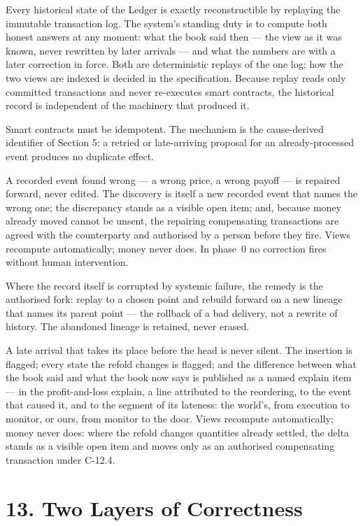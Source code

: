 \documentclass[11pt,a4paper]{article}
\newcommand{\clabel}[1]{\leavevmode\hypertarget{clause-#1}{}%
  \marginpar{\raggedright\scriptsize\ttfamily\textcolor{gray}{#1}}}
\begin{document}
\clabel{C-12.1}Every historical state of the Ledger is exactly
reconstructible by replaying the immutable transaction log. The
system's standing duty is to compute both honest answers at any moment:
what the book said then --- the view as it was known, never rewritten
by later arrivals --- and what the numbers are with a later correction
in force. Both are deterministic replays of the one log; how the two
views are indexed is decided in the specification.
\clabel{C-12.2}Because replay reads only committed transactions and
never re-executes smart contracts, the historical record is independent
of the machinery that produced it.

\clabel{C-12.3}Smart contracts must be idempotent. The mechanism is the
cause-derived identifier of Section 5: a retried or late-arriving
proposal for an already-processed event produces no duplicate effect.

\clabel{C-12.4}A recorded event found wrong --- a wrong price, a wrong
payoff --- is repaired forward, never edited. The discovery is itself a
new recorded event that names the wrong one; the discrepancy stands as
a visible open item; and, because money already moved cannot be unsent,
the repairing compensating transactions are agreed with the
counterparty and authorised by a person before they fire. Views
recompute automatically; money never does. In phase~0 no correction
fires without human intervention.

\clabel{C-12.5}Where the record itself is corrupted by systemic
failure, the remedy is the authorised fork: replay to a chosen point
and rebuild forward on a new lineage that names its parent point ---
the rollback of a bad delivery, not a rewrite of history. The abandoned
lineage is retained, never erased.

\clabel{C-12.6}A late arrival that takes its place before the head is
never silent. The insertion is flagged; every state the refold changes
is flagged; and the difference between what the book said and what the
book now says is published as a named explain item --- in the
profit-and-loss explain, a line attributed to the reordering, to the
event that caused it, and to the segment of its lateness: the world's,
from execution to monitor, or ours, from monitor to the door. Views
recompute automatically; money never does: where the refold changes
quantities already settled, the delta stands as a visible open item and
moves only as an authorised compensating transaction under C-12.4.

\hypertarget{two-layers-of-correctness}{%
\section{13. Two Layers of
Correctness}\label{two-layers-of-correctness}}
\end{document}
